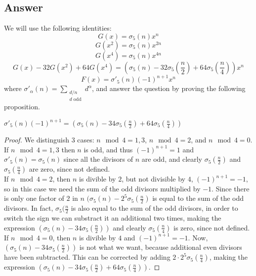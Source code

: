 \subsection*{Answer}
\noindent
We will use the following identities:
\[
    G(x)=\sigma_5(n)x^n
\]
\[
    G(x^2)=\sigma_5(n)x^{2n}
\]
\[
    G(x^4)=\sigma_5(n)x^{4n}
\]
\[
    G(x)-32G(x^2)+64G(x^4)= (\sigma_5(n) - 32 \sigma_5(\frac{n}{2}) + 64 \sigma_5(\frac{n}{4}) ) x^{n}
\]
\[
    F(x)=\sigma{'}_5(n) (-1)^{n+1}x^n
\]
where $\sigma{'}_{\alpha}(n) = \sum_{\substack{d/n \\ d \text{ odd} }}d^{\alpha}$, and answer the question by
proving the following proposition.

\begin{proposition}
    $\sigma{'}_5(n) (-1)^{n+1} = (\sigma_5(n) - 34 \sigma_5(\frac{n}{2}) + 64 \sigma_5(\frac{n}{4}) )$
\end{proposition}

\begin{proof}
    We distinguish $3$ cases:
        $n \mod 4 = 1,3$,
        $n \mod 4 = 2$, and
        $n \mod 4 = 0$.
\newline\\
    If $n \mod 4 = 1,3$ then $n$ is odd, and thus $(-1)^{n+1}=1$ and $\sigma{'}_5(n) = \sigma_5(n)$ since all the
    divisors of $n$ are odd, and clearly $\sigma_5(\frac{n}{2})$ and $\sigma_5(\frac{n}{4})$ are zero, since not defined.
\newline\\
    If $n \mod 4 = 2$, then $n$ is divible by $2$, but not divisible by $4$, $(-1)^{n+1}=-1$, so in this case
    we need the sum of the odd divisors multiplied by $-1$. Since there is only one factor of $2$ in $n$
    $(\sigma_5(n) - 2^5 \sigma_5(\frac{n}{2})$ is equal to the sum of the odd divisors. In fact, $\sigma_5(\frac{n}{2}$
    is also equal to the sum of the odd divisors, in order to switch the sign we can substract it an additional two
    times, making the expression $(\sigma_5(n) - 34 \sigma_5(\frac{n}{2}))$ and clearly $\sigma_5(\frac{n}{4})$
    is zero, since not defined.
\newline\\
    If $n \mod 4 = 0$, then $n$ is divible by $4$ and $(-1)^{n+1}=-1$. Now, $(\sigma_5(n) - 34 \sigma_5(\frac{n}{2}))$
    is not what we want, because additional even divisors have been subtracted. This can be corrected by adding
    $2 \cdot 2^5 \sigma_5(\frac{n}{4})$, making the expression $(\sigma_5(n) - 34 \sigma_5(\frac{n}{2}) + 64 \sigma_5(\frac{n}{4}) )$.
\end{proof}


